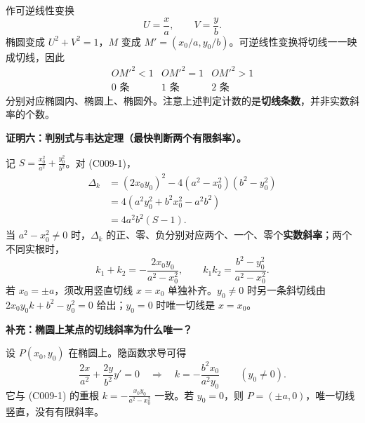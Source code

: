 \begin{proofbox}
作可逆线性变换
\[
U=\frac{x}{a},\qquad V=\frac{y}{b}.
\]
椭圆变成 $U^2+V^2=1$，$M$ 变成 $M'=(x_0/a,y_0/b)$。可逆线性变换将切线一一映成切线，因此
\[
\begin{array}{c|c|c}
OM'^2<1 & OM'^2=1 & OM'^2>1\\ \hline
0\text{ 条} &1\text{ 条}&2\text{ 条}
\end{array}
\]
分别对应椭圆内、椭圆上、椭圆外。注意上述判定计数的是\textbf{切线条数}，并非实数斜率的个数。

\medskip
\textbf{证明六：判别式与韦达定理（最快判断两个有限斜率）。}

记 $S=\frac{x_0^2}{a^2}+\frac{y_0^2}{b^2}$。对 (C009-1)，
\begin{align*}
\Delta_k
&=(2x_0y_0)^2-4(a^2-x_0^2)(b^2-y_0^2)\\
&=4(a^2y_0^2+b^2x_0^2-a^2b^2)\\
&=\boxed{4a^2b^2(S-1)}.
\end{align*}
当 $a^2-x_0^2\ne0$ 时，$\Delta_k$ 的正、零、负分别对应两个、一个、零个\textbf{实数斜率}；两个不同实根时，
\[
k_1+k_2=-\frac{2x_0y_0}{a^2-x_0^2},\qquad
k_1k_2=\frac{b^2-y_0^2}{a^2-x_0^2}.
\]
若 $x_0=\pm a$，须改用竖直切线 $x=x_0$ 单独补齐。$y_0\ne0$ 时另一条斜切线由 $2x_0y_0k+b^2-y_0^2=0$ 给出；$y_0=0$ 时唯一切线是 $x=x_0$。

\medskip
\textbf{补充：椭圆上某点的切线斜率为什么唯一？}

设 $P(x_0,y_0)$ 在椭圆上。隐函数求导可得
\[
\frac{2x}{a^2}+\frac{2y}{b^2}y'=0
\quad\Longrightarrow\quad
\boxed{k=-\frac{b^2x_0}{a^2y_0}}\qquad(y_0\ne0).
\]
它与 (C009-1) 的重根 $k=-\frac{x_0y_0}{a^2-x_0^2}$ 一致。若 $y_0=0$，则 $P=(\pm a,0)$，唯一切线竖直，没有有限斜率。
\end{proofbox}
